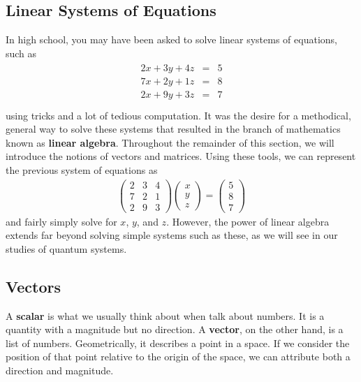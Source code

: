 \documentclass[11pt]{article} %
\begin{document}
\subsection{Linear Systems of Equations}
In high school, you may have been asked to solve linear systems of equations, such as
\begin{align}
    \begin{array}{ccc}
         2x + 3y + 4z & = & 5 \\
         7x + 2y + 1z & = & 8 \\
         2x + 9y + 3z & = & 7 \\
    \end{array} \nonumber
\end{align}
using tricks and a lot of tedious computation. It was the desire for a methodical, general way to solve these systems that resulted in the branch of mathematics known as \textbf{linear algebra}. Throughout the remainder of this section, we will introduce the notions of vectors and matrices. Using these tools, we can represent the previous system of equations as 
\begin{align}
    \begin{pmatrix}
        2 & 3 & 4 \\
        7 & 2 & 1 \\
        2 & 9 & 3
    \end{pmatrix}
    \begin{pmatrix}
        x \\
        y \\
        z
    \end{pmatrix}=
    \begin{pmatrix}
        5 \\
        8 \\
        7
    \end{pmatrix}\nonumber
\end{align}
and fairly simply solve for $x$, $y$, and $z$. However, the power of linear algebra extends far beyond solving simple systems such as these, as we will see in our studies of quantum systems.


\subsection{Vectors}

A \textbf{scalar} is what we usually think about when talk about numbers. It is a quantity with a magnitude but no direction. A \textbf{vector}, on the other hand, is a list of numbers. Geometrically, it describes a point in a space. If we consider the position of that point relative to the origin of the space, we can attribute both a direction and magnitude. 
\end{document}
